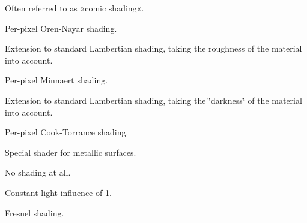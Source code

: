\begin{Desc}
\begin{description}
Often referred to as »comic shading«. \item[{\em 
\hypertarget{namespaceassimp_1_1material_ad8134a703f92e7023813f2b34a0753c0a548951fc13398003562db497783cb2fd}{Oren\+Nayar}\label{namespaceassimp_1_1material_ad8134a703f92e7023813f2b34a0753c0a548951fc13398003562db497783cb2fd}
}]Per-\/pixel Oren-\/\+Nayar shading.

Extension to standard Lambertian shading, taking the roughness of the material into account. \item[{\em 
\hypertarget{namespaceassimp_1_1material_ad8134a703f92e7023813f2b34a0753c0a06ac4c3389d9958a64e1430602c86eb9}{Minnaert}\label{namespaceassimp_1_1material_ad8134a703f92e7023813f2b34a0753c0a06ac4c3389d9958a64e1430602c86eb9}
}]Per-\/pixel Minnaert shading.

Extension to standard Lambertian shading, taking the \char`\"{}darkness\char`\"{} of the material into account. \item[{\em 
\hypertarget{namespaceassimp_1_1material_ad8134a703f92e7023813f2b34a0753c0af4fd8feb8966692f345e55868dc28eef}{Cook\+Torrance}\label{namespaceassimp_1_1material_ad8134a703f92e7023813f2b34a0753c0af4fd8feb8966692f345e55868dc28eef}
}]Per-\/pixel Cook-\/\+Torrance shading.

Special shader for metallic surfaces. \item[{\em 
\hypertarget{namespaceassimp_1_1material_ad8134a703f92e7023813f2b34a0753c0abeb3bc5fcce0d0c46d04ff78cd61dfe0}{No\+Shading}\label{namespaceassimp_1_1material_ad8134a703f92e7023813f2b34a0753c0abeb3bc5fcce0d0c46d04ff78cd61dfe0}
}]No shading at all.

Constant light influence of 1. \item[{\em 
\hypertarget{namespaceassimp_1_1material_ad8134a703f92e7023813f2b34a0753c0abe91fcdf16c1d76cc219d1f833cb4eed}{Fresnel}\label{namespaceassimp_1_1material_ad8134a703f92e7023813f2b34a0753c0abe91fcdf16c1d76cc219d1f833cb4eed}
}]Fresnel shading. \end{description}
\end{Desc}
